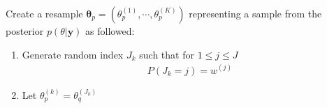       Create a resample $\mathbf{\theta}_p =
      (\theta_p^{(1)}, \cdots, \theta_p^{(K)})$ representing
      a sample from the posterior $p(\theta|\mathbf{y})$ as
      followed:

      \begin{enumerate}
          \item Generate random index $J_k$ such that for
              $1\leq j \leq J$
              \begin{align*}
                  P(J_k = j) = w^{(j)}
              \end{align*}
          \item Let $\theta_p^{(k)} = \theta_q^{(J_k)}$
      \end{enumerate}
